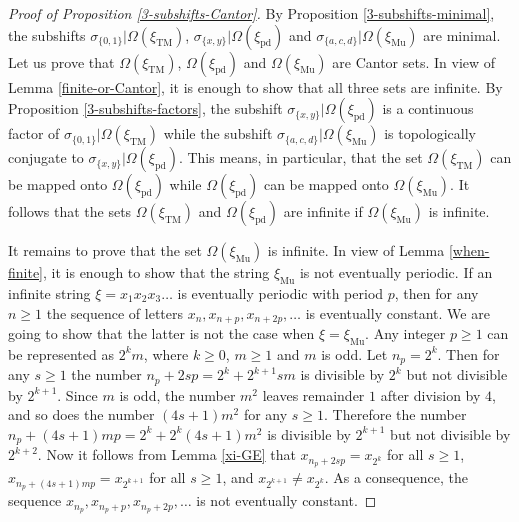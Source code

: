 \documentclass[12pt]{article}
\theoremstyle{definition}
\def\si{\sigma}
\def\Om{\Omega}
\def\xiTM{\xi_{\mathrm{TM}}}
\def\xipd{\xi_{\mathrm{pd}}}
\def\xiGE{\xi_{\mathrm{Mu}}}
\begin{document}
\begin{proof}[Proof of Proposition \ref{3-subshifts-Cantor}]
By Proposition \ref{3-subshifts-minimal}, the subshifts 
$\si_{\{0,1\}}|\Om(\xiTM)$, $\si_{\{x,y\}}|\Om(\xipd)$ and 
$\si_{\{a,c,d\}}|\Om(\xiGE)$ are minimal.  Let us prove that $\Om(\xiTM)$, 
$\Om(\xipd)$ and $\Om(\xiGE)$ are Cantor sets.  In view of Lemma 
\ref{finite-or-Cantor}, it is enough to show that all three sets are 
infinite.  By Proposition \ref{3-subshifts-factors}, the subshift 
$\si_{\{x,y\}}|\Om(\xipd)$ is a continuous factor of
$\si_{\{0,1\}}|\Om(\xiTM)$ while the subshift $\si_{\{a,c,d\}}|\Om(\xiGE)$ 
is topologically conjugate to $\si_{\{x,y\}}|\Om(\xipd)$.  This means, in 
particular, that the set $\Om(\xiTM)$ can be mapped onto $\Om(\xipd)$ while 
$\Om(\xipd)$ can be mapped onto $\Om(\xiGE)$.  It follows that the sets 
$\Om(\xiTM)$ and $\Om(\xipd)$ are infinite if $\Om(\xiGE)$ is infinite.

It remains to prove that the set $\Om(\xiGE)$ is infinite.  In view of 
Lemma \ref{when-finite}, it is enough to show that the string $\xiGE$ is 
not eventually periodic.  If an infinite string $\xi=x_1x_2x_3\ldots$ is 
eventually periodic with period $p$, then for any $n\ge1$ the sequence of 
letters $x_n,x_{n+p},x_{n+2p},\dots$ is eventually constant.  We are going 
to show that the latter is not the case when $\xi=\xiGE$.  Any integer 
$p\ge1$ can be represented as $2^km$, where $k\ge0$, $m\ge1$ and $m$ is 
odd.  Let $n_p=2^k$.  Then for any $s\ge1$ the number 
$n_p+2sp=2^k+2^{k+1}sm$ is divisible by $2^k$ but not divisible by 
$2^{k+1}$.  Since $m$ is odd, the number $m^2$ leaves remainder $1$ after 
division by $4$, and so does the number $(4s+1)m^2$ for any $s\ge1$.  
Therefore the number $n_p+(4s+1)mp=2^k+2^k(4s+1)m^2$ is divisible by 
$2^{k+1}$ but not divisible by $2^{k+2}$.  Now it follows from Lemma 
\ref{xi-GE} that $x_{n_p+2sp}=x_{2^k}$ for all $s\ge1$, 
$x_{n_p+(4s+1)mp}=x_{2^{k+1}}$ for all $s\ge1$, and $x_{2^{k+1}}\ne 
x_{2^k}$.  As a consequence, the sequence 
$x_{n_p},x_{n_p+p},x_{n_p+2p},\dots$ is not eventually constant.


\end{proof}
\end{document}
